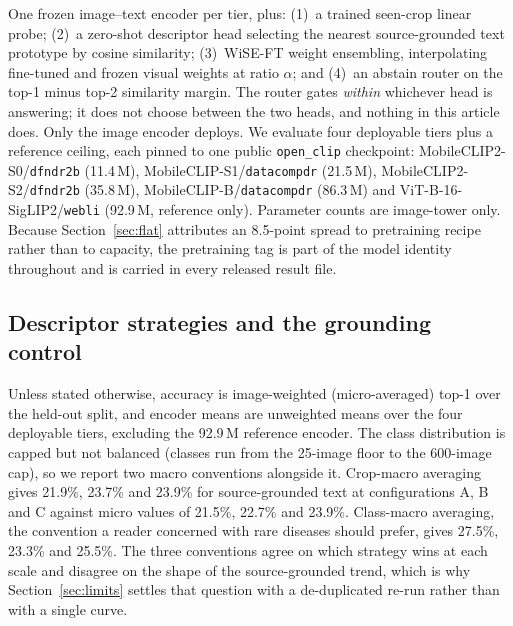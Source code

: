\documentclass[a4paper,fleqn]{cas-dc}
\begin{document}
One frozen image--text encoder per tier, plus: (1)~a trained seen-crop linear probe; (2)~a zero-shot
descriptor head selecting the nearest source-grounded text prototype by cosine similarity;
(3)~WiSE-FT weight ensembling, interpolating fine-tuned and frozen visual weights at ratio $\alpha$;
and (4)~an abstain router on the top-1 minus top-2 similarity margin. The router gates \emph{within}
whichever head is answering; it does not choose between the two heads, and nothing in this article
does. Only the image encoder deploys.
We evaluate four deployable tiers plus a reference ceiling, each pinned to one public
\texttt{open\_clip} checkpoint: MobileCLIP2-S0/\texttt{dfndr2b} (11.4\,M),
MobileCLIP-S1/\texttt{datacompdr} (21.5\,M), MobileCLIP2-S2/\texttt{dfndr2b} (35.8\,M),
MobileCLIP-B/\texttt{datacompdr} (86.3\,M) and ViT-B-16-SigLIP2/\texttt{webli} (92.9\,M, reference
only). Parameter counts are image-tower only. Because Section~\ref{sec:flat} attributes an
8.5-point spread to pretraining recipe rather than to capacity, the pretraining tag is part of the
model identity throughout and is carried in every released result file.

\subsection{Descriptor strategies and the grounding control}
\label{sec:strategies}


Unless stated otherwise, accuracy is image-weighted (micro-averaged) top-1 over the held-out
split, and encoder means are unweighted means over the four deployable tiers, excluding the
92.9\,M reference encoder. The class distribution is capped but not balanced (classes run
from the 25-image floor to the 600-image cap), so we report two macro conventions alongside it.
Crop-macro averaging gives 21.9\%, 23.7\% and 23.9\% for source-grounded text at configurations A,
B and C against micro values of 21.5\%, 22.7\% and 23.9\%. Class-macro averaging, the convention a
reader concerned with rare diseases should prefer, gives 27.5\%, 23.3\% and 25.5\%. The three
conventions agree on which strategy wins at each scale and disagree on the shape of the
source-grounded trend, which is why Section~\ref{sec:limits} settles that question with a
de-duplicated re-run rather than with a single curve.
\end{document}
